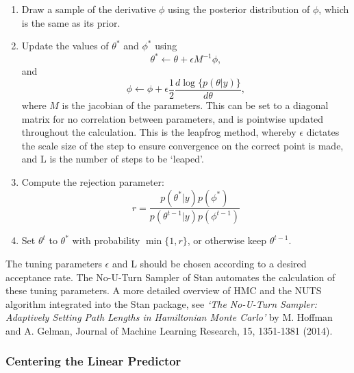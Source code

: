 \documentclass[
]{article}
\begin{document}
\begin{enumerate}
\item Draw a sample of the derivative $\phi$ using the posterior distribution of $\phi$, which is the same as its prior.
\item Update the values of $\theta^*$ and $\phi^*$ using
  \begin{equation}
    \theta^*\leftarrow \theta+\epsilon M^{-1}\phi,
  \end{equation}
  and
  \begin{equation}
    \phi\leftarrow \phi+\epsilon\frac{1}{2}\frac{d\log\{p(\theta|y)\}}{d\theta},
  \end{equation}
where $M$ is the jacobian of the parameters. This can be set to a diagonal matrix for no correlation between parameters, and is pointwise updated throughout the calculation. This is the leapfrog method, whereby $\epsilon$ dictates the scale size of the step to ensure convergence on the correct point is made, and L is the number of steps to be `leaped'.
\item Compute the rejection parameter:
  \begin{equation}
    r=\frac{p(\theta^*|y)p(\phi^*)}{p(\theta^{t-1}|y)p(\phi^{t-1})}
  \end{equation}
\item Set $\theta^t$ to $\theta^*$ with probability $\min\{1,r\}$, or otherwise keep $\theta^{t-1}$.
\end{enumerate}

The tuning parameters \(\epsilon\) and L should be chosen according to a desired acceptance rate. The No-U-Turn Sampler of Stan automates the calculation of these tuning parameters. A more detailed overview of HMC and the NUTS algorithm integrated into the Stan package, see \emph{`The No-U-Turn Sampler: Adaptively Setting Path Lengths
in Hamiltonian Monte Carlo'} by M. Hoffman and A. Gelman, Journal of Machine Learning Research, 15, 1351-1381 (2014).

\hypertarget{centering-the-linear-predictor}{%
\subsubsection{Centering the Linear Predictor}\label{centering-the-linear-predictor}}
\end{document}
